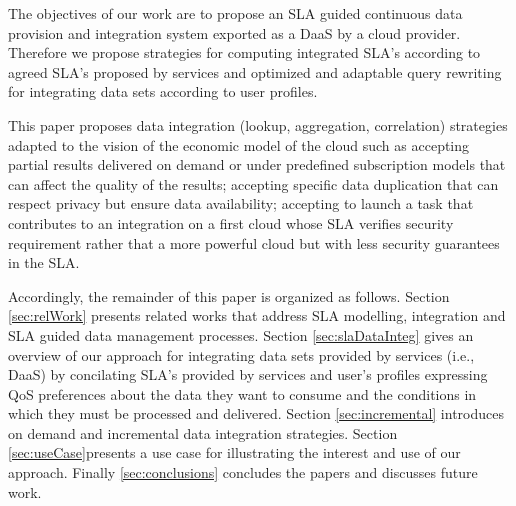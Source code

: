 The objectives of our work are to propose an SLA guided continuous data provision and integration system exported as a DaaS by a cloud provider. 
Therefore we propose strategies for computing integrated SLA’s according to agreed SLA’s proposed by services and optimized and adaptable query rewriting for integrating data sets  according to user profiles. 

This paper proposes data integration (lookup, aggregation, correlation) strategies adapted to the vision of the economic model of the cloud such as accepting partial results delivered on demand or under predefined subscription models that can affect the quality of the results; accepting specific data duplication that can respect privacy but ensure data availability; accepting to launch a task that contributes to an integration on a first cloud whose SLA verifies security requirement rather that a more powerful cloud but with less security guarantees in the SLA. 

Accordingly, the remainder of this paper is organized as follows. Section \ref{sec:relWork} presents related works that address SLA modelling, integration and SLA guided data management processes. Section \ref{sec:slaDataInteg} gives an overview of our approach for integrating data sets provided by services (i.e., DaaS) by concilating SLA's provided by services and user's profiles expressing QoS preferences about the data they want to consume and the conditions in which they must be processed and delivered. Section \ref{sec:incremental} introduces on demand and incremental data integration strategies. Section \ref{sec:useCase}presents a use case for illustrating the interest and use of our approach. Finally \ref{sec:conclusions} concludes the papers and discusses future work.